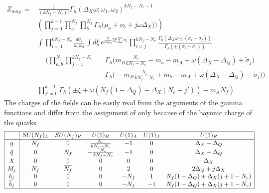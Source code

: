 \begin{equation}
\begin{aligned}
Z_{mag} %
\,= & \, \frac{1}{(k N_f - N_c)!}
 \Gamma_h ( \Delta_X \omega ; \omega_1 , \omega_2)^{ k N_f - N_c -1}  \\
 &  \left( \prod_{j=0}^{k-1}
\prod_a^{N_f } \prod_b^{N_f}  \Gamma_h \big( \mu_a+  \nu_b + j \omega \Delta_X) \big)  \right) \\
&\int  \prod_{i=1}^{ k N_f - N_c } \frac{d \sigma_i }{ \omega_1 \omega_2} \,\int
d \xi \, e^{ \frac{\pi i }{ \omega_1 \omega_2} 2 \xi  \sum \sigma_i }  
\prod_{i<j}^{k N_f - N_c } \frac{ \Gamma_h( \Delta_X \omega \pm (\sigma_i - \sigma_j)) }{ \Gamma_h ( \pm (\sigma_i - \sigma_j) )}
	\\&
\begin{aligned}
	 &  \bigg( \prod_{a,b}^{N_f} \prod_{j=1}^{k N_f - N_c }
	 && \Gamma_h \big( m_B \frac{N_c}{ k N_f-N_c} - m_a - m_A + \omega (\Delta_X - \Delta_Q)  + \tilde{\sigma}_j \big) \\
 & && \Gamma_h \big(  -m_B \frac{N_c}{k N_f-N_c} + \tilde{m}_b - m_A + \omega (\Delta_X - \Delta_Q)  - \tilde{\sigma}_j \big)  \bigg)
	\end{aligned}
	\\
	& \prod_{j'=0}^{k-1} \Gamma_h \left( \pm {\xi} +\omega \left(
	N_f ( 1 - \Delta_Q ) - \Delta_X ( N_c - j')  \right) - m_A N_f
 \right)
\end{aligned}
\end{equation}
The charges of the fields can be easily read from the arguments of the gamma functions and differ from the assignment of \cite{Nii:2014jsa} only because of the bayonic charge of the quarks
\begin{equation}
\begin{array}{|c |c c c c c c |}
\hline
 & SU(N_f)_L & SU(N_f)_R & U(1)_B & U(1)_A & U(1)_J & U(1)_R  \\
\hline
q & \overline{N_f} & 0  & \frac{N_c}{k N_f - N_c}  & -1  & 0  & \Delta_X - \Delta_Q \\
\tilde{q}   & 0  &N_f & -\frac{N_c}{k N_f - N_c} & - 1  & 0 &\Delta_X - \Delta_Q \\
X & 0 & 0 & 0 & 0 &0 & \Delta_X \\
M_j  & N_f & \overline{N_f} & 0 & 2 & 0 & 2 \Delta_Q + j \Delta_X\\
b_j & 0  & 0 & 0  &   -N_f &  1   & N_f ( 1 - \Delta_Q) + \Delta_X (j +1  - N_c)  \\
 \tilde{b} _j & 0  & 0 & 0  &   - N_f &  -1   & N_f ( 1 - \Delta_Q) + \Delta_X (j +1 - N_c)  \\
\hline
\end{array}
\end{equation}
